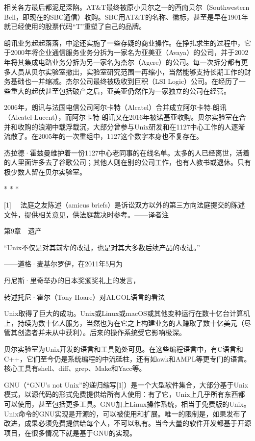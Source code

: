\documentclass[a4paper,12pt,UTF8,twoside]{ctexbook}
\begin{document}
{{相关各方最后都泥足深陷。AT\&T最终被原小贝尔之一的西南贝尔（Southwestern Bell，即现在的SBC通信）收购。SBC用AT\&T的名称、徽标，甚至是早在1901年就已经使用的股票代码“T”重塑了自己的品牌。

朗讯业务起起落落，中途还实施了一些存疑的商业操作。在挣扎求生的过程中，它于2000年将企业通信服务业务分拆为一家名为亚美亚（Avaya）的公司，并于2002年将其集成电路业务分拆为另一家名为杰尔（Agere）的公司。每一次拆分都有更多人员从贝尔实验室撤出，实验室研究范围一再缩小，当然能够支持长期工作的财务基础也一并缩减。杰尔公司最终被吸收到巨积（LSI Logic）公司。在经历了一些重大的起伏甚至包括破产之后，亚美亚仍然作为一家独立的公司在经营。

2006年，朗讯与法国电信公司阿尔卡特（Alcatel）合并成立阿尔卡特-朗讯（Alcatel-Lucent），而阿尔卡特-朗讯又在2016年被诺基亚收购。贝尔实验室在合并和收购的浪潮中载浮载沉，大部分曾参与Unix研发和在1127中心工作的人逐渐流散了。在2005年的一次重组中，1127这个数字本身也不复存在。

杰拉德·霍兹曼维护着一份1127中心老同事的在线名单。太多的人已经离世，活着的人里面许多去了谷歌公司；其他人则在别的公司工作，也有人教书或退休。只有极少数人留在贝尔实验室。



* * *



[1]　 法庭之友陈述（amicus briefs）是诉讼双方以外的第三方向法庭提交的陈述文件，提供相关意见，供法庭裁决时参考。——译者注





第9章　遗产


“Unix不仅是对其前辈的改进，也是对其大多数后续产品的改进。”

——道格·麦基尔罗伊，在2011年5月为

丹尼斯·里奇举办的日本奖颁奖礼上的发言，

转述托尼·霍尔（Tony Hoare）对ALGOL语言的看法

Unix取得了巨大的成功。Unix或Linux或macOS或其他变种运行在数十亿台计算机上，持续为数十亿人服务，当然也为在它之上构建业务的人赚取了数十亿美元（尽管其创造者并未从中获利）。后来的操作系统受它影响极深。

贝尔实验室为Unix开发的语言和工具随处可见。在这些编程语言中，有C语言和C++，它们至今仍是系统编程的中流砥柱，还有如awk和AMPL等更专门的语言。核心工具有shell、diff、grep、Make和Yacc等。

GNU（“GNU’s not Unix”的递归缩写[1]）是一个大型软件集合，大部分基于Unix模式，以源代码的形式免费提供给所有人使用：有了它，Unix上几乎所有东西都可以使用，甚至包括更多工具。GNU加上Linux操作系统，相当于免费版的Unix。Unix命令的GNU实现是开源的，可以被使用和扩展。唯一的限制是，如果发布了改进，成果必须免费提供给每个人，不可以私有。当今大量的软件开发都基于开源项目，在很多情况下就是基于GNU的实现。

}}
\end{document}
